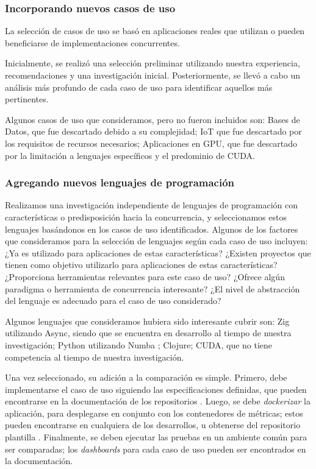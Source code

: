 \documentclass[11pt]{article}
\let\Oldsubsubsection\subsubsection
\renewcommand{\subsubsection}{\FloatBarrier\Oldsubsubsection}
\newcommand{\english}[1]{\textit{#1}}
\begin{document}
\subsubsection{Incorporando nuevos casos de uso}

La selección de casos de uso se basó en aplicaciones reales que utilizan o pueden beneficiarse de implementaciones concurrentes.

Inicialmente, se realizó una selección preliminar utilizando nuestra experiencia, recomendaciones y una investigación inicial. Posteriormente, se llevó a cabo un análisis más profundo de cada caso de uso para identificar aquellos más pertinentes.

Algunos casos de uso que consideramos, pero no fueron incluidos son:
Bases de Datos, que fue descartado debido a su complejidad;
IoT que fue descartado por los requisitos de recursos necesarios;
Aplicaciones en GPU, que fue descartado por la limitación a lenguajes específicos y el predominio de CUDA.

\subsubsection{Agregando nuevos lenguajes de programación}

Realizamos una investigación independiente de lenguajes de programación con características o predisposición hacia la concurrencia, y seleccionamos estos lenguajes basándonos en los casos de uso identificados. Algunos de los factores que consideramos para la selección de lenguajes según cada caso de uso incluyen:
¿Ya es utilizado para aplicaciones de estas características?
¿Existen proyectos que tienen como objetivo utilizarlo para aplicaciones de estas características?
¿Proporciona herramientas relevantes para este caso de uso?
¿Ofrece algún paradigma o herramienta de concurrencia interesante?
¿El nivel de abstracción del lenguaje es adecuado para el caso de uso considerado?

Algunos lenguajes que consideramos hubiera sido interesante cubrir son:
Zig utilizando Async, siendo que se encuentra en desarrollo al tiempo de nuestra investigación;
Python utilizando Numba \cite{python:lib:numba};
Clojure;
CUDA, que no tiene competencia al tiempo de nuestra investigación.

Una vez seleccionado, su adición a la comparación es simple. Primero, debe implementarse el caso de uso siguiendo las especificaciones definidas, que pueden encontrarse en la documentación de los repositorios \cite{repos:docs}. Luego, se debe \textit{dockerizar} la aplicación, para desplegarse en conjunto con los contenedores de métricas; estos pueden encontrarse en cualquiera de los desarrollos, u obtenerse del repositorio plantilla \cite{repos:template}. Finalmente, se deben ejecutar las pruebas en un ambiente común para ser comparadas; los \english{dashboards} para cada caso de uso pueden ser encontrados en la documentación.
\end{document}
